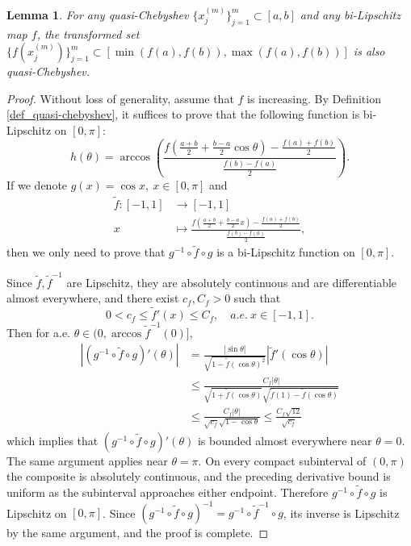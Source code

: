 \documentclass{article}
\numberwithin{equation}{section}
\newtheorem{lemma}{Lemma}
\def\lt{\left}
\def\rt{\right}
\begin{document}
\begin{lemma}\label{lem:transform-cheby}
    For any quasi-Chebyshev $\{x_j^{(m)}\}_{j=1}^m\subset [a,b]$ and any bi-Lipschitz map $f$, the transformed set $\{f(x_j^{(m)})\}_{j=1}^m\subset [\min (f(a),f(b)), \max (f(a),f(b)) ]$ is also quasi-Chebyshev.
\end{lemma}
    \begin{proof}
        Without loss of generality, assume that $f$ is increasing. By Definition \ref{def_quasi-chebyshev}, it suffices to prove that the following function is bi-Lipschitz on $[0,\pi]$:
        \begin{equation}
            h(\theta) = \arccos\lt( \frac{f(\frac{a+b}{2}+\frac{b-a}{2}\cos\theta) - \frac{f(a) + f(b)}{2}}{\frac{f(b)-f(a)}{2}} \rt).
        \end{equation}
        If we denote $g(x) = \cos x, \ x\in[0,\pi]$ and \begin{equation}
            \begin{split}
                \tilde f\colon [-1,1]&\to [-1,1] \\
                x&\mapsto \frac{f(\frac{a+b}{2}+\frac{b-a}{2}x) - \frac{f(a) + f(b)}{2}}{\frac{f(b)-f(a)}{2}},
            \end{split}
        \end{equation}
        then we only need to prove that $g^{-1}\circ \tilde f\circ g$ is a bi-Lipschitz function on $[0,\pi]$. 

        Since $\tilde f, \tilde f^{-1}$ are Lipschitz, they are absolutely continuous and are differentiable almost everywhere, and there exist $c_f,C_f>0$ such that 
        $$0<c_f\leq \tilde f'(x)\leq C_f,\quad a.e.\ x\in[-1,1].$$
        Then for a.e. $\theta\in (0,\arccos\tilde f^{-1}(0)]$, 
        \begin{equation}
        \begin{split}
            |(g^{-1}\circ \tilde f\circ g)'(\theta)| &= \frac{|\sin\theta|}{\sqrt{1-\tilde f(\cos\theta)^2}}|\tilde f'(\cos\theta)| \\
            &\leq \frac{C_f|\theta|}{\sqrt{1+\tilde f(\cos\theta)}\sqrt{\tilde f(1)-\tilde f(\cos\theta)}} \\
            &\leq \frac{C_f|\theta|}{\sqrt{c_f}\sqrt{1-\cos\theta}} 
            \leq \frac{C_f\sqrt{12}}{\sqrt{c_f}}
        \end{split}
        \end{equation}
        which implies that $(g^{-1}\circ \tilde f\circ g)'(\theta)$ is bounded almost everywhere near $\theta=0$. The same argument applies near $\theta=\pi$. On every compact subinterval of $(0,\pi)$ the composite is absolutely continuous, and the preceding derivative bound is uniform as the subinterval approaches either endpoint. Therefore $g^{-1}\circ \tilde f\circ g$ is Lipschitz on $[0,\pi]$. Since $(g^{-1}\circ \tilde f\circ g)^{-1} = g^{-1}\circ \tilde f^{-1}\circ g$, its inverse is Lipschitz by the same argument, and the proof is complete.
    \end{proof}
    
\end{document}

